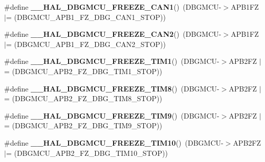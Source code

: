 \begin{DoxyCompactItemize}
\item 
\#define {\bfseries \+\_\+\+\_\+\+H\+A\+L\+\_\+\+D\+B\+G\+M\+C\+U\+\_\+\+F\+R\+E\+E\+Z\+E\+\_\+\+C\+A\+N1}()~(D\+B\+G\+M\+CU-\/$>$A\+P\+B1\+FZ $\vert$= (D\+B\+G\+M\+C\+U\+\_\+\+A\+P\+B1\+\_\+\+F\+Z\+\_\+\+D\+B\+G\+\_\+\+C\+A\+N1\+\_\+\+S\+T\+OP))\hypertarget{group___h_a_l___exported___macros_ga1d225003f36f6a22ffea1a41a4a78cec}{}\label{group___h_a_l___exported___macros_ga1d225003f36f6a22ffea1a41a4a78cec}

\item 
\#define {\bfseries \+\_\+\+\_\+\+H\+A\+L\+\_\+\+D\+B\+G\+M\+C\+U\+\_\+\+F\+R\+E\+E\+Z\+E\+\_\+\+C\+A\+N2}()~(D\+B\+G\+M\+CU-\/$>$A\+P\+B1\+FZ $\vert$= (D\+B\+G\+M\+C\+U\+\_\+\+A\+P\+B1\+\_\+\+F\+Z\+\_\+\+D\+B\+G\+\_\+\+C\+A\+N2\+\_\+\+S\+T\+OP))\hypertarget{group___h_a_l___exported___macros_gadb4f2b03a03936de95c1a9f939d452c0}{}\label{group___h_a_l___exported___macros_gadb4f2b03a03936de95c1a9f939d452c0}

\item 
\#define {\bfseries \+\_\+\+\_\+\+H\+A\+L\+\_\+\+D\+B\+G\+M\+C\+U\+\_\+\+F\+R\+E\+E\+Z\+E\+\_\+\+T\+I\+M1}()~(D\+B\+G\+M\+CU-\/$>$A\+P\+B2\+FZ $\vert$= (D\+B\+G\+M\+C\+U\+\_\+\+A\+P\+B2\+\_\+\+F\+Z\+\_\+\+D\+B\+G\+\_\+\+T\+I\+M1\+\_\+\+S\+T\+OP))\hypertarget{group___h_a_l___exported___macros_ga93d7e54d78e5dea068f5f6a94d5f94c7}{}\label{group___h_a_l___exported___macros_ga93d7e54d78e5dea068f5f6a94d5f94c7}

\item 
\#define {\bfseries \+\_\+\+\_\+\+H\+A\+L\+\_\+\+D\+B\+G\+M\+C\+U\+\_\+\+F\+R\+E\+E\+Z\+E\+\_\+\+T\+I\+M8}()~(D\+B\+G\+M\+CU-\/$>$A\+P\+B2\+FZ $\vert$= (D\+B\+G\+M\+C\+U\+\_\+\+A\+P\+B2\+\_\+\+F\+Z\+\_\+\+D\+B\+G\+\_\+\+T\+I\+M8\+\_\+\+S\+T\+OP))\hypertarget{group___h_a_l___exported___macros_gaeee90b698bfc2421155265b4c5b43f09}{}\label{group___h_a_l___exported___macros_gaeee90b698bfc2421155265b4c5b43f09}

\item 
\#define {\bfseries \+\_\+\+\_\+\+H\+A\+L\+\_\+\+D\+B\+G\+M\+C\+U\+\_\+\+F\+R\+E\+E\+Z\+E\+\_\+\+T\+I\+M9}()~(D\+B\+G\+M\+CU-\/$>$A\+P\+B2\+FZ $\vert$= (D\+B\+G\+M\+C\+U\+\_\+\+A\+P\+B2\+\_\+\+F\+Z\+\_\+\+D\+B\+G\+\_\+\+T\+I\+M9\+\_\+\+S\+T\+OP))\hypertarget{group___h_a_l___exported___macros_ga391a0780e10993d06c519addf582a438}{}\label{group___h_a_l___exported___macros_ga391a0780e10993d06c519addf582a438}

\item 
\#define {\bfseries \+\_\+\+\_\+\+H\+A\+L\+\_\+\+D\+B\+G\+M\+C\+U\+\_\+\+F\+R\+E\+E\+Z\+E\+\_\+\+T\+I\+M10}()~(D\+B\+G\+M\+CU-\/$>$A\+P\+B2\+FZ $\vert$= (D\+B\+G\+M\+C\+U\+\_\+\+A\+P\+B2\+\_\+\+F\+Z\+\_\+\+D\+B\+G\+\_\+\+T\+I\+M10\+\_\+\+S\+T\+OP))\hypertarget{group___h_a_l___exported___macros_gaee80dea9c85b61d2fb2499cbd97d8478}{}\label{group___h_a_l___exported___macros_gaee80dea9c85b61d2fb2499cbd97d8478}


\end{DoxyCompactItemize}

